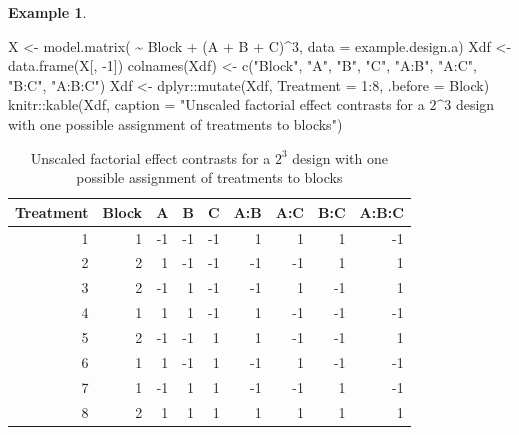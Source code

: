 \documentclass[
]{book}
\newenvironment{Shaded}{\begin{snugshade}}{\end{snugshade}}
\newcommand{\AttributeTok}[1]{\textcolor[rgb]{0.77,0.63,0.00}{#1}}
\newcommand{\DecValTok}[1]{\textcolor[rgb]{0.00,0.00,0.81}{#1}}
\newcommand{\FunctionTok}[1]{\textcolor[rgb]{0.00,0.00,0.00}{#1}}
\newcommand{\NormalTok}[1]{#1}
\newcommand{\OtherTok}[1]{\textcolor[rgb]{0.56,0.35,0.01}{#1}}
\newcommand{\SpecialCharTok}[1]{\textcolor[rgb]{0.00,0.00,0.00}{#1}}
\newcommand{\StringTok}[1]{\textcolor[rgb]{0.31,0.60,0.02}{#1}}
\theoremstyle{definition}
\theoremstyle{definition}
\newtheorem{example}{Example}[chapter]
\theoremstyle{definition}
\theoremstyle{definition}
\theoremstyle{remark}
\begin{document}
\begin{example}
\begin{Shaded}
\begin{Highlighting}[]
\NormalTok{X }\OtherTok{\textless{}{-}} \FunctionTok{model.matrix}\NormalTok{( }\SpecialCharTok{\textasciitilde{}}\NormalTok{ Block }\SpecialCharTok{+}\NormalTok{ (A }\SpecialCharTok{+}\NormalTok{ B }\SpecialCharTok{+}\NormalTok{ C)}\SpecialCharTok{\^{}}\DecValTok{3}\NormalTok{, }\AttributeTok{data =}\NormalTok{ example.design.a)}
\NormalTok{Xdf }\OtherTok{\textless{}{-}} \FunctionTok{data.frame}\NormalTok{(X[, }\SpecialCharTok{{-}}\DecValTok{1}\NormalTok{])}
\FunctionTok{colnames}\NormalTok{(Xdf) }\OtherTok{\textless{}{-}} \FunctionTok{c}\NormalTok{(}\StringTok{"Block"}\NormalTok{, }\StringTok{"A"}\NormalTok{, }\StringTok{"B"}\NormalTok{, }\StringTok{"C"}\NormalTok{, }\StringTok{"A:B"}\NormalTok{, }\StringTok{"A:C"}\NormalTok{, }\StringTok{"B:C"}\NormalTok{, }\StringTok{"A:B:C"}\NormalTok{)}
\NormalTok{Xdf }\OtherTok{\textless{}{-}}\NormalTok{ dplyr}\SpecialCharTok{::}\FunctionTok{mutate}\NormalTok{(Xdf, }\AttributeTok{Treatment =} \DecValTok{1}\SpecialCharTok{:}\DecValTok{8}\NormalTok{, }\AttributeTok{.before =}\NormalTok{ Block)}
\NormalTok{knitr}\SpecialCharTok{::}\FunctionTok{kable}\NormalTok{(Xdf, }\AttributeTok{caption =} \StringTok{"Unscaled factorial effect contrasts for a $2\^{}3$ design with one possible assignment of treatments to blocks"}\NormalTok{)}
\end{Highlighting}
\end{Shaded}

\begin{table}

\caption{\label{tab:block-frac-1-mm}Unscaled factorial effect contrasts for a $2^3$ design with one possible assignment of treatments to blocks}
\centering
\begin{tabular}[t]{r|r|r|r|r|r|r|r|r}
\hline
Treatment & Block & A & B & C & A:B & A:C & B:C & A:B:C\\
\hline
1 & 1 & -1 & -1 & -1 & 1 & 1 & 1 & -1\\
\hline
2 & 2 & 1 & -1 & -1 & -1 & -1 & 1 & 1\\
\hline
3 & 2 & -1 & 1 & -1 & -1 & 1 & -1 & 1\\
\hline
4 & 1 & 1 & 1 & -1 & 1 & -1 & -1 & -1\\
\hline
5 & 2 & -1 & -1 & 1 & 1 & -1 & -1 & 1\\
\hline
6 & 1 & 1 & -1 & 1 & -1 & 1 & -1 & -1\\
\hline
7 & 1 & -1 & 1 & 1 & -1 & -1 & 1 & -1\\
\hline
8 & 2 & 1 & 1 & 1 & 1 & 1 & 1 & 1\\
\hline
\end{tabular}
\end{table}


\end{example}
\end{document}
